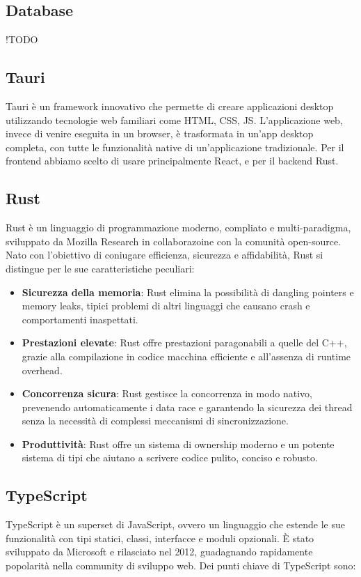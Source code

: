\documentclass[target=bach,aauheader=,style=]{thud}
\begin{document}
\subsection{Database}
!TODO

\subsection{Tauri}
Tauri è un framework innovativo che permette di creare applicazioni desktop utilizzando tecnologie web familiari come HTML, CSS, JS. L'applicazione web, invece di venire eseguita in un browser, è trasformata in un'app desktop completa, con tutte le funzionalità native di un'applicazione tradizionale.
Per il frontend abbiamo scelto di usare principalmente React, e per il backend Rust.

\subsection{Rust}
Rust è un linguaggio di programmazione moderno, compliato e multi-paradigma, sviluppato da Mozilla Research in collaborazoine con la comunità open-source. Nato con l'obiettivo di coniugare efficienza, sicurezza e affidabilità, Rust si distingue per le sue caratteristiche peculiari:
\begin{itemize}
  \item \textbf{Sicurezza della memoria}: Rust elimina la possibilità di dangling pointers e memory leaks, tipici problemi di altri linguaggi che causano crash e comportamenti inaspettati.
  \item \textbf{Prestazioni elevate}: Rust offre prestazioni paragonabili a quelle del C++, grazie alla compilazione in codice macchina efficiente e all'assenza di runtime overhead.
  \item \textbf{Concorrenza sicura}: Rust gestisce la concorrenza in modo nativo, prevenendo automaticamente i data race e garantendo la sicurezza dei thread senza la necessità di complessi meccanismi di sincronizzazione.
  \item \textbf{Produttività}: Rust offre un sistema di ownership moderno e un potente sistema di tipi che aiutano a scrivere codice pulito, conciso e robusto.
\end{itemize}


\subsection{TypeScript}
TypeScript è un superset di JavaScript, ovvero un linguaggio che estende le sue funzionalità con tipi statici, classi, interfacce e moduli opzionali. È stato sviluppato da Microsoft e rilasciato nel 2012, guadagnando rapidamente popolarità nella community di sviluppo web.
Dei punti chiave di TypeScript sono:
\end{document}
